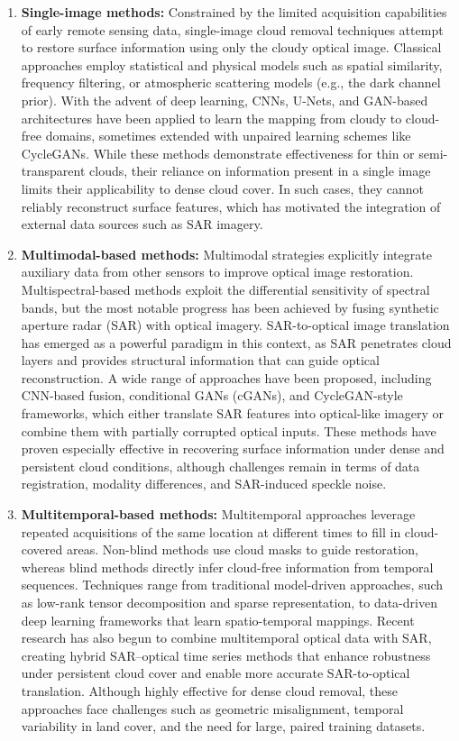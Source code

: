\begin{enumerate}[label=(\Alph*)]
    \item \textbf{Single-image methods:} Constrained by the limited acquisition capabilities of early remote sensing data, single-image cloud removal techniques attempt to restore surface information using only the cloudy optical image. Classical approaches employ statistical and physical models such as spatial similarity, frequency filtering, or atmospheric scattering models (e.g., the dark channel prior). With the advent of deep learning, CNNs, U-Nets, and GAN-based architectures have been applied to learn the mapping from cloudy to cloud-free domains, sometimes extended with unpaired learning schemes like CycleGANs. While these methods demonstrate effectiveness for thin or semi-transparent clouds, their reliance on information present in a single image limits their applicability to dense cloud cover. In such cases, they cannot reliably reconstruct surface features, which has motivated the integration of external data sources such as SAR imagery.
    
    \item \textbf{Multimodal-based methods:} Multimodal strategies explicitly integrate auxiliary data from other sensors to improve optical image restoration. Multispectral-based methods exploit the differential sensitivity of spectral bands, but the most notable progress has been achieved by fusing synthetic aperture radar (SAR) with optical imagery. SAR-to-optical image translation has emerged as a powerful paradigm in this context, as SAR penetrates cloud layers and provides structural information that can guide optical reconstruction. A wide range of approaches have been proposed, including CNN-based fusion, conditional GANs (cGANs), and CycleGAN-style frameworks, which either translate SAR features into optical-like imagery or combine them with partially corrupted optical inputs. These methods have proven especially effective in recovering surface information under dense and persistent cloud conditions, although challenges remain in terms of data registration, modality differences, and SAR-induced speckle noise.
    
    \item \textbf{Multitemporal-based methods:} Multitemporal approaches leverage repeated acquisitions of the same location at different times to fill in cloud-covered areas. Non-blind methods use cloud masks to guide restoration, whereas blind methods directly infer cloud-free information from temporal sequences. Techniques range from traditional model-driven approaches, such as low-rank tensor decomposition and sparse representation, to data-driven deep learning frameworks that learn spatio-temporal mappings. Recent research has also begun to combine multitemporal optical data with SAR, creating hybrid SAR–optical time series methods that enhance robustness under persistent cloud cover and enable more accurate SAR-to-optical translation. Although highly effective for dense cloud removal, these approaches face challenges such as geometric misalignment, temporal variability in land cover, and the need for large, paired training datasets.
\end{enumerate}

